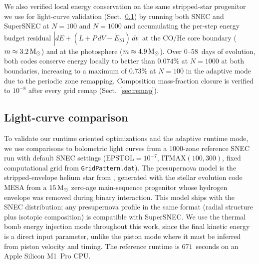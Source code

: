 \documentclass[twocolumn,linenumbers]{aastex701}
\begin{document}
We also verified local energy conservation on the same stripped-star progenitor we use for light-curve validation (Sect.~\ref{sec:lc_validation}) by running both SNEC and SuperSNEC at $N = 100$ and $N = 1000$ and accumulating the per-step energy budget residual $|dE + (L + P\,dV - \dot{E}_\mathrm{Ni})\,dt|$ at the CO/He core boundary ($m \approx 3.2\,{\rm M}_\odot$) and at the photosphere ($m \approx 4.9\,{\rm M}_\odot$).  Over 0--58~days of evolution, both codes conserve energy locally to better than $0.074\%$ at $N = 1000$ at both boundaries, increasing to a maximum of $0.73\%$ at $N = 100$ in the adaptive mode due to the periodic zone remapping. Composition mass-fraction closure is verified to $10^{-8}$ after every grid remap (Sect.~\ref{sec:remap}).


\subsection{Light-curve comparison}
\label{sec:lc_validation}
To validate our runtime oriented optimizations and the adaptive runtime mode, we use comparisons to bolometric light curves from a 1000-zone reference SNEC run with default SNEC settings ($\mathrm{EPSTOL}=10^{-7}$, $\mathrm{ITMAX}(100,300)$, fixed computational grid from \texttt{Grid\-Pattern.dat}). The presupernova model is the stripped-envelope helium star from \citet{PiroMorozova2014,Morozova2015}, generated with the stellar evolution code MESA \citep{Paxton2011} from a $15\,{\rm M}_\odot$ zero-age main-sequence progenitor whose hydrogen envelope was removed during binary interaction. This model ships with the SNEC distribution; any presupernova profile in the same format (radial structure plus isotopic composition) is compatible with SuperSNEC. We use the thermal bomb energy injection mode throughout this work, since the final kinetic energy is a direct input parameter, unlike the piston mode where it must be inferred from piston velocity and timing. The reference runtime is $671$~seconds on an Apple Silicon M1~Pro CPU.
\end{document}

